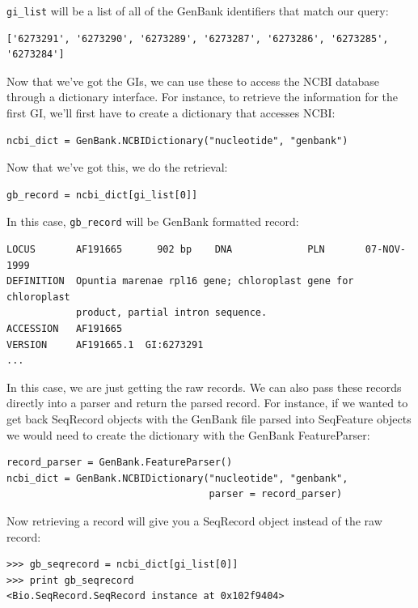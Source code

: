 \documentclass{report}
\begin{document}
\verb|gi_list| will be a list of all of the GenBank identifiers that match our query:

\begin{verbatim}
['6273291', '6273290', '6273289', '6273287', '6273286', '6273285', '6273284']
\end{verbatim}

Now that we've got the GIs, we can use these to access the NCBI database through a dictionary interface. For instance, to retrieve the information for the first GI, we'll first have to create a dictionary that accesses NCBI:

\begin{verbatim}
ncbi_dict = GenBank.NCBIDictionary("nucleotide", "genbank")
\end{verbatim}

Now that we've got this, we do the retrieval:

\begin{verbatim}
gb_record = ncbi_dict[gi_list[0]]
\end{verbatim}

In this case, \verb|gb_record| will be GenBank formatted record:

\begin{verbatim}
LOCUS       AF191665      902 bp    DNA             PLN       07-NOV-1999
DEFINITION  Opuntia marenae rpl16 gene; chloroplast gene for chloroplast
            product, partial intron sequence.
ACCESSION   AF191665
VERSION     AF191665.1  GI:6273291
...
\end{verbatim}

In this case, we are just getting the raw records. We can also pass these records directly into a parser and return the parsed record. For instance, if we wanted to get back SeqRecord objects with the GenBank file parsed into SeqFeature objects we would need to create the dictionary with the GenBank FeatureParser:

\begin{verbatim}
record_parser = GenBank.FeatureParser()
ncbi_dict = GenBank.NCBIDictionary("nucleotide", "genbank",
                                   parser = record_parser)
\end{verbatim}

Now retrieving a record will give you a SeqRecord object instead of the raw record:

\begin{verbatim}
>>> gb_seqrecord = ncbi_dict[gi_list[0]]
>>> print gb_seqrecord
<Bio.SeqRecord.SeqRecord instance at 0x102f9404>
\end{verbatim}
\end{document}
